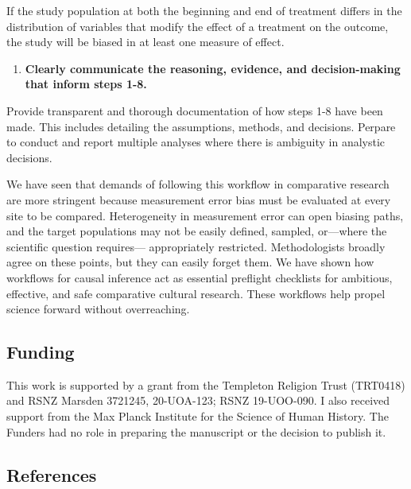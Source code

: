 \documentclass[
  single column]{article}
\providecommand{\tightlist}{%
  \setlength{\itemsep}{0pt}\setlength{\parskip}{0pt}}\usepackage{longtable,booktabs,array}
\begin{document}
If the study population at both the beginning and end of treatment
differs in the distribution of variables that modify the effect of a
treatment on the outcome, the study will be biased in at least one
measure of effect.

\begin{enumerate}
\def\labelenumi{\arabic{enumi}.}
\setcounter{enumi}{8}
\tightlist
\item
  \textbf{Clearly communicate the reasoning, evidence, and
  decision-making that inform steps 1-8.}
\end{enumerate}

Provide transparent and thorough documentation of how steps 1-8 have
been made. This includes detailing the assumptions, methods, and
decisions. Perpare to conduct and report multiple analyses where there
is ambiguity in analystic decisions.

We have seen that demands of following this workflow in comparative
research are more stringent because measurement error bias must be
evaluated at every site to be compared. Heterogeneity in measurement
error can open biasing paths, and the target populations may not be
easily defined, sampled, or---where the scientific question requires---
appropriately restricted. Methodologists broadly agree on these points,
but they can easily forget them. We have shown how workflows for causal
inference act as essential preflight checklists for ambitious,
effective, and safe comparative cultural research. These workflows help
propel science forward without overreaching.

\newpage{}

\subsection{Funding}\label{funding}

This work is supported by a grant from the Templeton Religion Trust
(TRT0418) and RSNZ Marsden 3721245, 20-UOA-123; RSNZ 19-UOO-090. I also
received support from the Max Planck Institute for the Science of Human
History. The Funders had no role in preparing the manuscript or the
decision to publish it.

\newpage{}

\subsection{References}\label{references}
\end{document}

